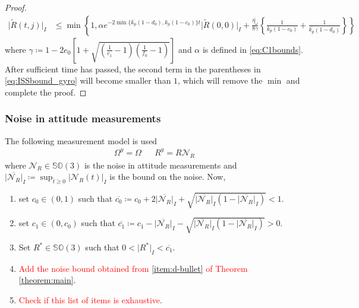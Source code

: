 \documentclass{article}
\newcommand{\SOthree}{\mathbb{SO}(3)}
\newcommand{\Omegay}{\Omega^y}
\newcommand{\brackets}[1]{\left(#1\right)}
\newcommand{\Rtilde}{\tilde{R}}
\newcommand{\normSOthree}[1]{{{\vert}#1 {\vert}_I}}
\newcommand{\expo}[1]{e^{#1}}
\newcommand{\maxnoisegyro}{\overline{\eta_\omega}}
\newcommand{\noiseatt}{\mathcal{N}_R}
\newcommand{\maxnoiseatt}{\normSOthree{\overline{\noiseatt}}}
\newcommand{\cobar}{\overline{c_0}}
\begin{document}
\begin{proof}
\begin{align}
    \normSOthree{\Rtilde(t,j)}&\leq \min\left\{1, \alpha\expo{-2 \min\{\overline{k_p}(1-d_0), k_p(1-c_0)\} t}\normSOthree{\Rtilde(0,0)} + \frac{\maxnoisegyro}{8\gamma}\left\{\frac{1}{k_p(1-c_0)} + \frac{1}{\overline{k_p}(1-d_0)}\right\}\right\} \label{eq:ISSbound_gyro}
\end{align}
where $\gamma \coloneqq {1 - 2e_0\left[1 + \sqrt{\brackets{\frac{1}{c_1}-1}\brackets{\frac{1}{f_0}-1}}\right]}$ and $\alpha$ is defined in \eqref{eq:C1bounds}. After sufficient time has passed, the second term in the parentheses in \eqref{eq:ISSbound_gyro} will become smaller than $1$, which will remove the $\min$ and complete the proof. 
\end{proof}

\subsubsection{Noise in attitude measurements}
The following measurement model is used
\begin{align}\label{eq:measurement_model_ISS_att}
    \Omegay = \Omega  && R^y = R \noiseatt
\end{align}
where $\noiseatt\in\SOthree$ is the noise in attitude measurements and $\maxnoiseatt\coloneqq \sup_{t\geq 0}\normSOthree{\noiseatt(t)}$ is the bound on the noise.  Now,
\begin{enumerate}[label={(\Alph*)}]
    \item set $c_0\in(0,1)$ such that $\cobar\coloneqq c_0 + 2\maxnoiseatt + \sqrt{\maxnoiseatt(1-\maxnoiseatt)}  < 1 $. \label{item-A}
    \item set $c_1\in (0,c_0)$ such that $\overline{c_1} \coloneqq c_1 - \maxnoiseatt - \sqrt{\maxnoiseatt(1-\maxnoiseatt)} > 0$.\label{item-B}
    \item Set $R^*\in\SOthree$ such that $0 < \normSOthree{R^*} < \overline{c_1}$. \label{item-C}
    \item \textcolor{red}{Add the noise bound obtained from \ref{item:d-bullet} of Theorem \ref{theorem:main}}. 
    \item \textcolor{red}{Check if this list of items is exhaustive}. 
\end{enumerate}
\end{document}
